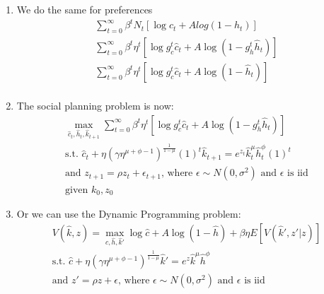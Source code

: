 \documentclass[answers]{exam}
\begin{document}
\begin{questions}
\begin{parts}
\begin{solution}
\begin{enumerate}
            \item We do the same for preferences 
            \begin{align*}
                \sum_{t=0}^{\infty} \beta^t N_t [\log{c_t} + A log(1-h_t)]\\
                \sum_{t=0}^{\infty} \beta^t \eta^t [\log{g_c^t \hat{c}_t} + A \log(1-g_h^t \hat{h}_t)]\\
                \sum_{t=0}^{\infty} \beta^t \eta^t [\log{g_c^t \hat{c}_t} + A \log(1- \hat{h}_t)]\\
            \end{align*}
            \item The social planning problem is now:
            \begin{align*}
                \max_{\hat{c}_t,\hat{h}_t,\hat{k}_{t+1}}\sum_{t=0}^{\infty} \beta^t \eta^t [\log{g_c^t \hat{c}_t} + A \log(1-g_h^t \hat{h}_t)]\\
                \text{s.t. } \hat{c}_t + \eta (\gamma \eta^{\mu + \phi -1})^{\frac{1}{1-\mu}} (1)^t \hat{k}_{t+1} = e^{z_t} \hat{k}_t^\mu \hat{h}_t^\phi (1)^t\\
                \text{and } z_{t+1} = \rho z_t + \epsilon_{t+1} \text{, where $\epsilon \sim N(0,\sigma^2)$ and $\epsilon$ is iid}\\
                \text{given $k_0, z_0$}
            \end{align*}
            \item Or we can use the Dynamic Programming problem:
            \begin{align*}
                V(\hat{k},z) = \max_{\hat{c},\hat{h},\hat{k}'} \log{\hat{c} + A \log(1-\hat{h})} + \beta \eta E[V(\hat{k}',z'|z)]\\
                \text{s.t. } \hat{c} + \eta (\gamma \eta^{\mu + \phi -1})^{\frac{1}{1-\mu}} \hat{k}' = e^{z} \hat{k}^\mu \hat{h}^\phi\\
                \text{and } z' = \rho z + \epsilon \text{, where $\epsilon \sim N(0,\sigma^2)$ and $\epsilon$ is iid}
            \end{align*}
        \end{enumerate}

        \end{solution}
\end{parts}
\end{questions}
\end{document}
